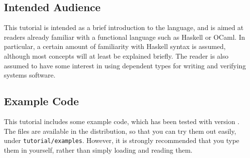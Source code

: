 \subsection{Intended Audience}

This tutorial is intended as a brief introduction to the language, and is aimed at readers already familiar with a functional language such as Haskell or OCaml.
In particular, a certain amount of familiarity with Haskell syntax is assumed, although most concepts will at least be explained briefly.
The reader is also assumed to have some interest in using dependent types for writing and verifying systems software.

\subsection{Example Code}

This tutorial includes some example code, which has been tested with \Idris{} version \version{}. The files are available in the \Idris{} distribution, so that you can try them out easily, under \texttt{tutorial/examples}. 
However, it is strongly recommended that you type them in yourself, rather than simply loading and reading them.
